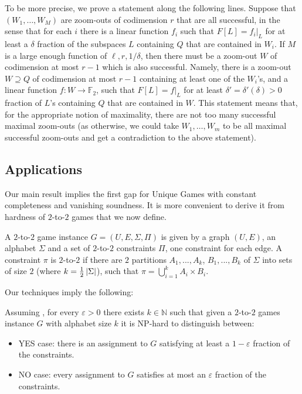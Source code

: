 \documentclass{toc}
\newcommand\card[1]{\left| {#1} \right|}
\newcommand\half{{1\over2}}
\newcommand\eps{\varepsilon}
\begin{document}
To be more precise, we prove a statement along the following lines.
Suppose that $(W_1,\ldots,W_M)$ are zoom-outs of codimension $r$ that are all successful,
in the sense that for each $i$ there is a linear function $f_i$ such that $F[L] = f_{i}|_{L}$
for at least
a %
$\delta$ fraction of the subspaces $L$ containing $Q$ that are contained in
$W_i$. If $M$ is a large enough function of $\ell, r, 1/\delta$, then there must
be a zoom-out $W$ of codimension at most $r-1$ which is also successful. Namely, there is
a zoom-out $W\supseteq Q$ of codimension at most $r-1$ containing at least one of the $W_i$'s,
and a linear function $f\colon W\to\mathbb{F}_2$,
such that $F[L] = f|_{L}$ for at least $\delta' = \delta'(\delta)>0$ fraction of $L$'s containing
$Q$ that are contained in $W$. This statement means that, for the appropriate notion of maximality,
there are not too many successful maximal zoom-outs (as otherwise, we could take $W_1,\ldots,W_m$ to
be all maximal successful zoom-outs and get a contradiction to the above statement).


\subsection{Applications}

Our main result implies the first gap for Unique Games with constant completeness and vanishing soundness. It is more convenient to
derive it from hardness of $2$-to-$2$ games that we now define.

\begin{definition}
A $2$-to-$2$ game instance $G=(U,E,\Sigma,\Pi)$ is given by a graph $(U,E)$, an alphabet $\Sigma$ and a set of
$2$-to-$2$ constraints $\Pi$, one constraint for each edge. A constraint $\pi$ is $2$-to-$2$ if there are $2$ partitions
$A_1,...,A_k$, $B_1,...,B_k$ of $\Sigma$ into sets of size $2$ (where $k=\half\card{\Sigma}$), such that
$\pi = \bigcup_{i=1}^{k}{A_i\times B_i}$.
\end{definition}

Our techniques imply the following:
\begin{theorem}
Assuming , for every $\eps>0$ there exists $k\in\mathbb{N}$ such that given a $2$-to-$2$
games instance $G$ with alphabet size $k$ it is NP-hard to distinguish between:
\begin{itemize}
  \item YES case: there is an assignment to $G$ satisfying at least
  a %
  $1-\eps$ fraction of the constraints.
  \item NO case: every assignment to $G$ satisfies at most
  an %
  $\eps$ fraction of the constraints.
\end{itemize}
\end{theorem}
\end{document}
